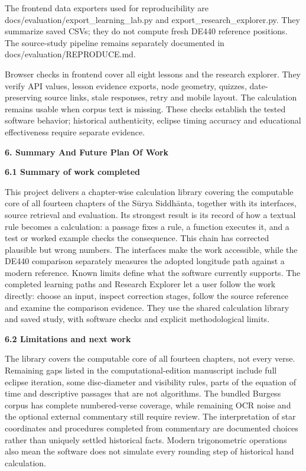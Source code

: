 \documentclass[
]{article}
\begin{document}
The frontend data exporters used for reproducibility are
docs/evaluation/export\_learning\_lab.py and
export\_research\_explorer.py. They summarize saved CSVs; they do not
compute fresh DE440 reference positions. The source-study pipeline
remains separately documented in docs/evaluation/REPRODUCE.md.

Browser checks in frontend cover all eight lessons and the research
explorer. They verify API values, lesson evidence exports, node
geometry, quizzes, date-preserving source links, stale responses, retry
and mobile layout. The calculation remains usable when corpus text is
missing. These checks establish the tested software behavior; historical
authenticity, eclipse timing accuracy and educational effectiveness
require separate evidence.

\textbf{6. Summary And Future Plan Of Work}

\textbf{6.1 Summary of work completed}

This project delivers a chapter-wise calculation library covering the
computable core of all fourteen chapters of the Sūrya Siddhānta,
together with its interfaces, source retrieval and evaluation. Its
strongest result is its record of how a textual rule becomes a
calculation: a passage fixes a rule, a function executes it, and a test
or worked example checks the consequence. This chain has corrected
plausible but wrong numbers. The interfaces make the work accessible,
while the DE440 comparison separately measures the adopted longitude
path against a modern reference. Known limits define what the software
currently supports. The completed learning paths and Research Explorer
let a user follow the work directly: choose an input, inspect correction
stages, follow the source reference and examine the comparison evidence.
They use the shared calculation library and saved study, with software
checks and explicit methodological limits.

\textbf{6.2 Limitations and next work}

The library covers the computable core of all fourteen chapters, not
every verse. Remaining gaps listed in the computational-edition
manuscript include full eclipse iteration, some disc-diameter and
visibility rules, parts of the equation of time and descriptive passages
that are not algorithms. The bundled Burgess corpus has complete
numbered-verse coverage, while remaining OCR noise and the optional
external commentary still require review. The interpretation of star
coordinates and procedures completed from commentary are documented
choices rather than uniquely settled historical facts. Modern
trigonometric operations also mean the software does not simulate every
rounding step of historical hand calculation.
\end{document}

